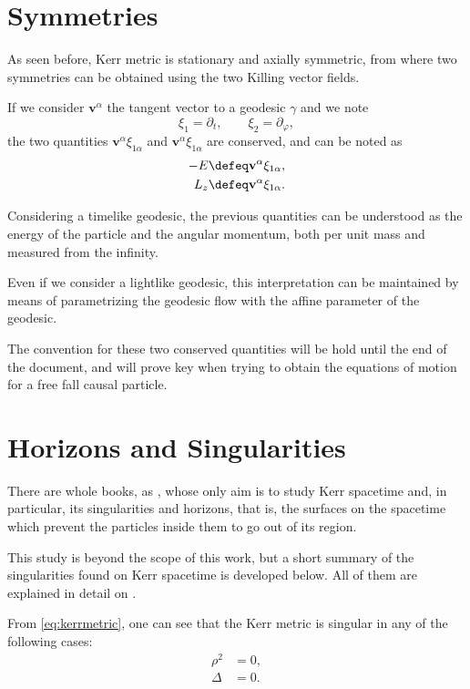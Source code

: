 \section{Symmetries}

As seen before, Kerr metric is stationary and axially symmetric, from where two symmetries can be obtained using the two Killing vector fields.

If we consider $\mathbf{v}^\alpha$ the tangent vector to a geodesic $\gamma$ and we note
\[
	\xi_1 = \partial_t, \qquad \xi_2 = \partial_\varphi,
\]
the two quantities $\mathbf{v}^\alpha \xi_{1\alpha}$ and $\mathbf{v}^\alpha \xi_{1\alpha}$ are conserved, and can be noted as
\begin{align}
	\label{eq:energy}
	-E &\defeq \mathbf{v}^\alpha \xi_{1\alpha}, \\
	L_z &\defeq \mathbf{v}^\alpha \xi_{1\alpha}.
\end{align}

Considering a timelike geodesic, the previous quantities can be understood as the energy of the particle and the angular momentum, both per unit mass and measured from the infinity.

Even if we consider a lightlike geodesic, this interpretation can be maintained by means of parametrizing the geodesic flow with the affine parameter of the geodesic.

The convention for these two conserved quantities will be hold until the end of the document, and will prove key when trying to obtain the equations of motion for a free fall causal particle.


\section{Horizons and Singularities}

There are whole books, as \cite{oneill95}, whose only aim is to study Kerr spacetime and, in particular, its singularities and horizons, that is, the surfaces on the spacetime which prevent the particles inside them to go out of its region.

This study is beyond the scope of this work, but a short summary of the singularities found on Kerr spacetime is developed below. All of them are explained in detail on \cite[Sec. 2.4]{galindo14}.

From \autoref{eq:kerrmetric}, one can see that the Kerr metric is singular in any of the following cases:
\begin{align}
	\rho^2 &= 0, \\
	\Delta &= 0.
\end{align}

